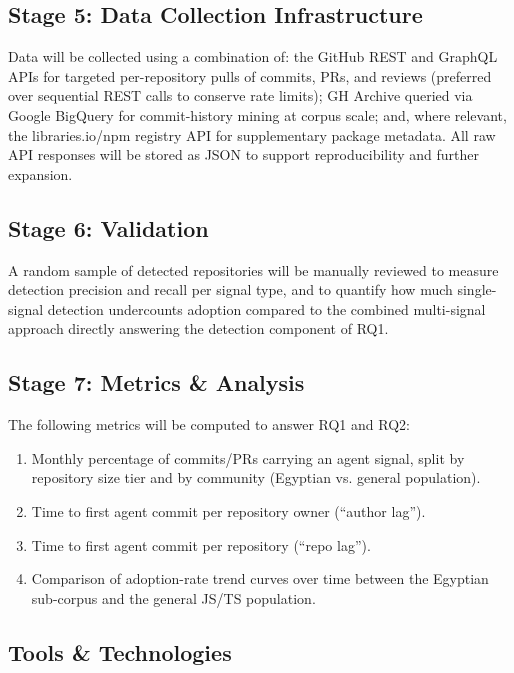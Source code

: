 \documentclass[11pt,a4paper]{article}
\begin{document}
\subsection{Stage 5: Data Collection Infrastructure}
Data will be collected using a combination of: the GitHub REST and GraphQL APIs for targeted per-repository pulls of commits, PRs, and reviews (preferred over sequential REST calls to conserve rate limits); GH Archive queried via Google BigQuery for commit-history mining at corpus scale; and, where relevant, the libraries.io/npm registry API for supplementary package metadata. All raw API responses will be stored as JSON to support reproducibility and further expansion.

\subsection{Stage 6: Validation}
A random sample of detected repositories will be manually reviewed to measure detection precision and recall per signal type, and to quantify how much single-signal detection undercounts adoption compared to the combined multi-signal approach directly answering the detection component of RQ1.

\subsection{Stage 7: Metrics \& Analysis}
The following metrics will be computed to answer RQ1 and RQ2:
\begin{enumerate}
    \item Monthly percentage of commits/PRs carrying an agent signal, split by repository size tier and by community (Egyptian vs. general population).
    \item Time to first agent commit per repository owner (``author lag'').
    \item Time to first agent commit per repository (``repo lag'').
    \item Comparison of adoption-rate trend curves over time between the Egyptian sub-corpus and the general JS/TS population.
\end{enumerate}
\newpage
\subsection{Tools \& Technologies}
\end{document}
